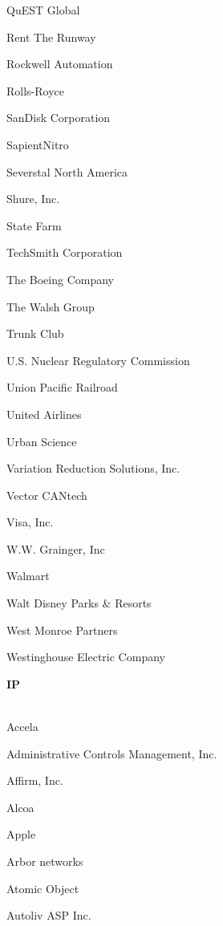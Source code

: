\documentclass[twoside]{article}
\begin{document}
\begin{center}
\begin{multicols}{5}
\begin{FlushLeft}
\begin{compactitem}
\item QuEST Global
\item Rent The Runway
\item Rockwell Automation
\item Rolls-Royce
\item SanDisk Corporation
\item SapientNitro
\item Severstal North America
\item Shure, Inc.
\item State Farm
\item TechSmith Corporation
\item The Boeing Company
\item The Walsh Group
\item Trunk Club
\item U.S. Nuclear Regulatory Commission
\item Union Pacific Railroad
\item United Airlines
\item Urban Science
\item Variation Reduction Solutions, Inc.
\item Vector CANtech
\item Visa, Inc.
\item W.W. Grainger, Inc
\item Walmart
\item Walt Disney Parks \& Resorts
\item West Monroe Partners
\item Westinghouse Electric Company
\end{compactitem}
        \end{FlushLeft}
        \vspace{1em}
        {\fontsize{14}{16}\selectfont \bf IP}\\
        \vspace{-1em}
        ~\hrulefill~
        \vspace{-.9em}
        \begin{FlushLeft}
        \begin{compactitem}
        \item Accela
\item Administrative Controls Management, Inc.
\item Affirm, Inc.
\item Alcoa
\item Apple
\item Arbor networks
\item Atomic Object
\item Autoliv ASP Inc.

\end{compactitem}
\end{FlushLeft}
\end{multicols}
\end{center}
\end{document}
